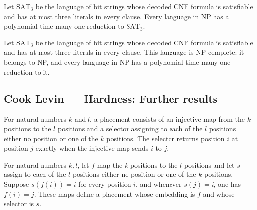 \begin{theorem}
\label{Complexity.SAT3_NPHard}
\leanok
{}
Let $\mathrm{SAT}_3$ be the language of bit strings whose decoded CNF formula is
satisfiable and has at most three literals in every clause. Every language in NP has a
polynomial-time many-one reduction to $\mathrm{SAT}_3$.
\end{theorem}

\begin{theorem}
\label{Complexity.SAT3_NPComplete}
\leanok
{}
Let $\mathrm{SAT}_3$ be the language of bit strings whose decoded CNF formula is
satisfiable and has at most three literals in every clause. This language is
NP-complete: it belongs to NP, and every language in NP has a polynomial-time many-one
reduction to it.
\end{theorem}

\subsection*{Cook Levin --- Hardness: Further results}

\begin{definition}
\label{Complexity.clPlacement}
\leanok
For natural numbers $k$ and $l$, a placement consists of an injective map from the $k$
positions to the $l$ positions and a selector assigning to each of the $l$ positions
either no position or one of the $k$ positions. The selector returns position $i$ at
position $j$ exactly when the injective map sends $i$ to $j$.
\end{definition}

\begin{definition}
\label{Complexity.clPlacement.ofInverse}
\leanok
{}
For natural numbers $k,l$, let $f$ map the $k$ positions to the $l$ positions and let
$s$ assign to each of the $l$ positions either no position or one of the $k$ positions.
Suppose $s(f(i))=i$ for every position $i$, and whenever $s(j)=i$, one has $f(i)=j$.
These maps define a placement whose embedding is $f$ and whose selector is $s$.
\end{definition}

